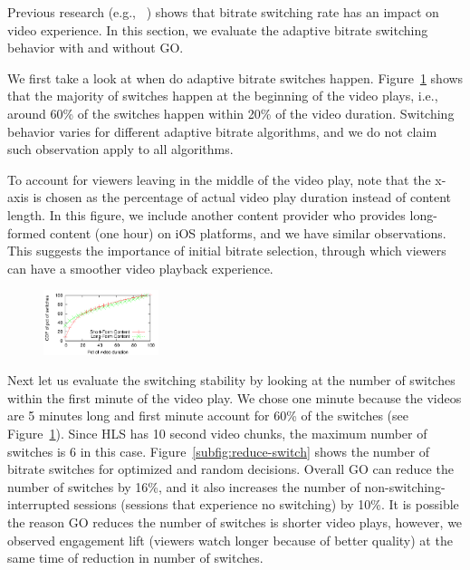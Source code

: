 \label{subsec:adaptive-bitrate}

Previous research (e.g., ~\cite{user-adaptive,videoqoe}) shows that bitrate switching rate has an impact on video experience. In this section, we evaluate the adaptive 
bitrate switching behavior with and without GO. 

We first take a look at when do adaptive bitrate switches happen. Figure~\ref{fig:switch-time-dist} shows that the 
majority of switches happen at the beginning of the video plays, i.e., around 60\% of the switches 
happen within 20\% of the video duration. Switching behavior varies for different adaptive bitrate algorithms, and we do not 
claim such observation apply to all algorithms.

To account for viewers leaving in the middle of the video play, note that the x-axis is chosen as the percentage of actual 
video play duration instead of content length. 
In this figure, we include another content provider who provides long-formed content (one hour) on iOS platforms, and we have similar observations. This suggests the importance of initial bitrate selection, through which viewers can have a smoother video playback experience.

\begin{figure}[h!]
\centering
 \includegraphics[width=0.3\textwidth] {figures/switch-time-dist.pdf}
\label{fig:switch-time-dist}
\end{figure}

Next let us evaluate the switching stability by looking at the number of switches within the first minute of the video play.
We chose one minute because the videos are 5 minutes long and first minute account for 60\% of the switches (see Figure~\ref{fig:switch-time-dist}). 
Since HLS has 10 second video chunks, the maximum number of switches is 6 in this case.
Figure~\ref{subfig:reduce-switch} shows the number of bitrate switches for optimized and random decisions. 
Overall GO can reduce the number of switches by 16\%, and it also increases the number of non-switching-interrupted sessions 
(sessions that experience no switching) by 10\%.
It is possible the reason GO reduces the number of switches is shorter video plays, however, we observed engagement lift
(viewers watch longer because of better quality) at the same time of reduction in number of switches.

